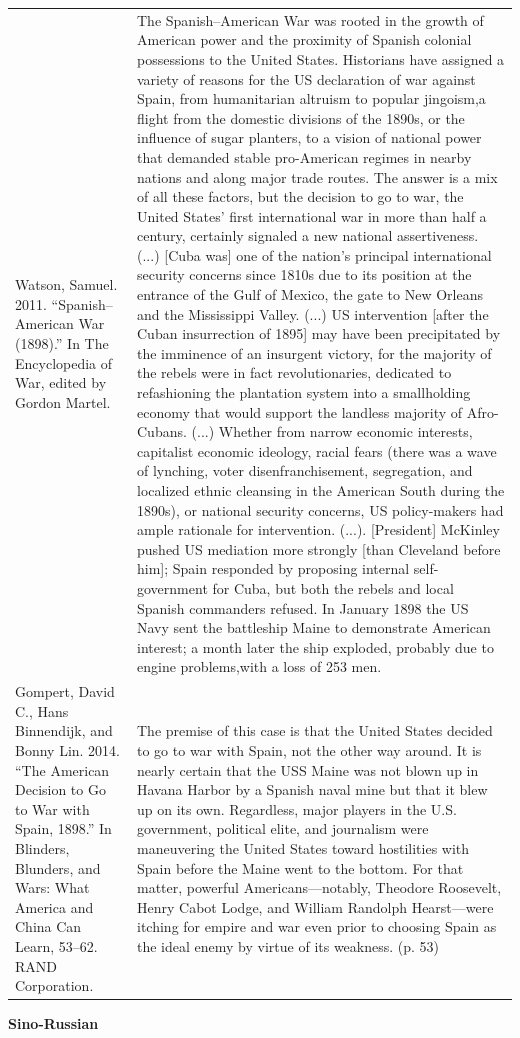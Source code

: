 {\begin{longtable}{p{}p{}}
Watson, Samuel. 2011. “Spanish–American War (1898).” In The Encyclopedia of War, edited by Gordon Martel. & The Spanish–American War was rooted in the growth of American power and the proximity of Spanish colonial possessions to the United States. Historians have assigned a variety of reasons for the US declaration of war against Spain, from humanitarian altruism to popular jingoism,a flight from the domestic divisions of the 1890s, or the influence of sugar planters, to a vision of national power that demanded stable pro-American regimes in nearby nations and along major trade routes. The answer is a mix of all these factors, but the decision to go to war, the United States' first international war in more than half a century, certainly signaled a new national assertiveness. (...) [Cuba was] one of the nation's principal international security concerns since 1810s due to its position at the entrance of the Gulf of Mexico, the gate to New Orleans and the Mississippi Valley. (...) US intervention [after the Cuban insurrection of 1895] may have been precipitated by the imminence of an insurgent victory, for the majority of the rebels were in fact revolutionaries, dedicated to refashioning the plantation system into a smallholding economy that would support the landless majority of Afro-Cubans. (...) Whether from narrow economic interests, capitalist economic ideology, racial fears (there was a wave of lynching, voter disenfranchisement, segregation, and localized ethnic cleansing in the American South during the 1890s), or national security concerns, US policy-makers had ample rationale for intervention. (...). [President] McKinley pushed US mediation more strongly [than Cleveland before him]; Spain responded by proposing internal self-government for Cuba, but both the rebels and local Spanish commanders refused. In January 1898 the US Navy sent the battleship Maine to demonstrate American interest; a month later the ship exploded, probably due to engine problems,with a loss of 253 men. 
\\
Gompert, David C., Hans Binnendijk, and Bonny Lin. 2014. “The American Decision to Go to War with Spain, 1898.” In Blinders, Blunders, and Wars: What America and China Can Learn, 53–62. RAND Corporation. & The premise of this case is that the United States decided to go to war with Spain, not the other way around. It is nearly certain that the USS Maine was not blown up in Havana Harbor by a Spanish naval mine but that it blew up on its own. Regardless, major players in the U.S. government, political elite, and journalism were maneuvering the United States toward hostilities with Spain before the Maine went to the bottom. For that matter, powerful Americans—notably, Theodore Roosevelt, Henry Cabot Lodge, and William Randolph Hearst—were itching for empire and war even prior to choosing Spain as the ideal enemy by virtue of its weakness. (p. 53)
\\
\end{longtable}}
\clearpage
         \textbf{Sino-Russian} 

